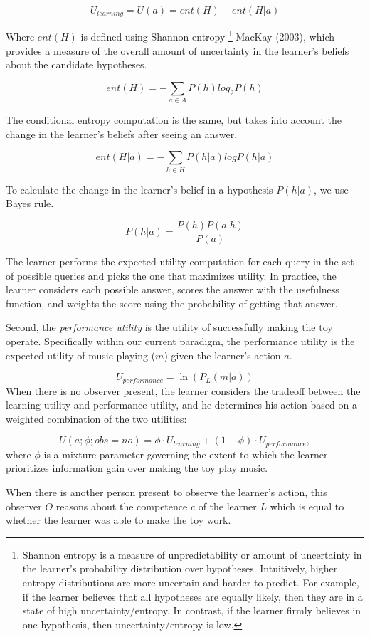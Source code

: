 \documentclass[10pt, letterpaper]{article}
\begin{document}
\[ U_{learning} = U(a) = ent(H) - ent(H|a)\]

Where \(ent(H)\) is defined using Shannon entropy
\footnote{Shannon entropy is a measure of unpredictability or amount of uncertainty in the learner's probability distribution over hypotheses. Intuitively, higher entropy distributions are more uncertain and harder to predict. For example, if the learner believes that all hypotheses are equally likely, then they are in a state of high uncertainty/entropy. In contrast, if the learner firmly believes in one hypothesis, then uncertainty/entropy is low.}
MacKay (2003), which provides a measure of the overall amount of
uncertainty in the learner's beliefs about the candidate hypotheses.

\[ent(H) = -\sum_{a\in A}{P(h)log_2P(h)}\]

The conditional entropy computation is the same, but takes into account
the change in the learner's beliefs after seeing an answer.

\[ ent(H|a) = -\sum_{h\in H}{P(h|a)logP(h|a)} \]

To calculate the change in the learner's belief in a hypothesis
\(P(h|a)\), we use Bayes rule.

\[ P(h|a) = \frac{P(h)P(a|h)}{P(a)} \]

The learner performs the expected utility computation for each query in
the set of possible queries and picks the one that maximizes utility. In
practice, the learner considers each possible answer, scores the answer
with the usefulness function, and weights the score using the
probability of getting that answer.

Second, the \emph{performance utility} is the utility of successfully
making the toy operate. Specifically within our current paradigm, the
performance utility is the expected utility of music playing (\(m\))
given the learner's action \(a\).

\[ U_{performance} = \ln(P_L(m | a)) \] When there is no observer
present, the learner considers the tradeoff between the learning utility
and performance utility, and he determines his action based on a
weighted combination of the two utilities:

\[ U(a;\phi; obs = no) = \phi \cdot U_{learning} + (1-\phi) \cdot U_{performance} ,\]
\noindent
where \(\phi\) is a mixture parameter governing the extent to which the
learner prioritizes information gain over making the toy play music.

When there is another person present to observe the learner's action,
this observer \(O\) reasons about the competence \(c\) of the learner
\(L\) which is equal to whether the learner was able to make the toy
work.
\end{document}
